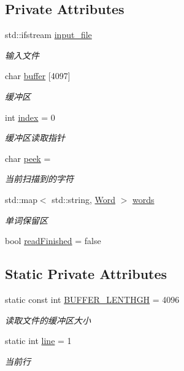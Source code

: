 \subsection*{Private Attributes}
\begin{DoxyCompactItemize}
\item 
std\+::ifstream \hyperlink{class_lexer_a606dd5cec5ec316ca1b1df40823fb853}{input\+\_\+file}
\begin{DoxyCompactList}\small\item\em 输入文件 \end{DoxyCompactList}\item 
char \hyperlink{class_lexer_a372c56c466c70d808bdcdb11e94bd914}{buffer} \mbox{[}4097\mbox{]}
\begin{DoxyCompactList}\small\item\em 缓冲区 \end{DoxyCompactList}\item 
int \hyperlink{class_lexer_a266317e9b89ad0e681fdb21032ef00f8}{index} = 0
\begin{DoxyCompactList}\small\item\em 缓冲区读取指针 \end{DoxyCompactList}\item 
char \hyperlink{class_lexer_a1c13ae056a34e7ec483c561152bb8d49}{peek} = \textquotesingle{} \textquotesingle{}
\begin{DoxyCompactList}\small\item\em 当前扫描到的字符 \end{DoxyCompactList}\item 
std\+::map$<$ std\+::string, \hyperlink{class_word}{Word} $>$ \hyperlink{class_lexer_add52df03b8546bfe059f4e1832141c16}{words}
\begin{DoxyCompactList}\small\item\em 单词保留区 \end{DoxyCompactList}\item 
bool \hyperlink{class_lexer_a123d0134daef2ce492f0707342456afc}{read\+Finished} = false
\end{DoxyCompactItemize}
\subsection*{Static Private Attributes}
\begin{DoxyCompactItemize}
\item 
static const int \hyperlink{class_lexer_af8222e02dc3180feb942b4a6d3083a22}{B\+U\+F\+F\+E\+R\+\_\+\+L\+E\+N\+T\+H\+GH} = 4096
\begin{DoxyCompactList}\small\item\em 读取文件的缓冲区大小 \end{DoxyCompactList}\item 
static int \hyperlink{class_lexer_a35d0802ee5cced4c5294fb6dc77ad2f4}{line} = 1
\begin{DoxyCompactList}\small\item\em 当前行 \end{DoxyCompactList}\end{DoxyCompactItemize}



